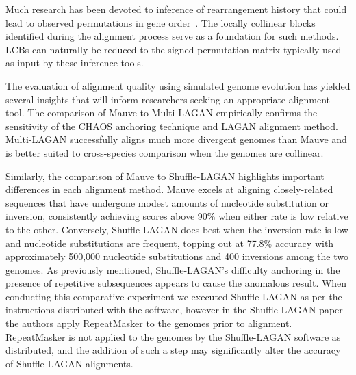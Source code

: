 \documentclass[titlepage,11pt]{article}
\begin{document}
Much research has been devoted to inference of rearrangement history that could
lead to observed permutations in gene
order~\citep{bourquepevzner,larget,badermoret,sankoff}. The locally collinear
blocks identified during the alignment process serve as a foundation for such
methods. LCBs can naturally be reduced to the signed permutation matrix
typically used as input by these inference tools.

The evaluation of alignment quality using simulated genome evolution has yielded
several insights that will inform researchers seeking an appropriate
alignment tool.  The comparison of Mauve to Multi-LAGAN empirically confirms
the sensitivity of the CHAOS anchoring technique and LAGAN alignment method.
Multi-LAGAN successfully aligns much more divergent genomes than Mauve and is
better suited to cross-species comparison when the genomes are collinear.

Similarly, the comparison of Mauve to Shuffle-LAGAN highlights important
differences in each alignment method.  Mauve excels at aligning closely-related
sequences that have undergone modest amounts of nucleotide substitution or
inversion, consistently achieving scores above 90\% when either rate is low
relative to the other.  Conversely, Shuffle-LAGAN does best when the inversion
rate is low and nucleotide substitutions are frequent, topping out at 77.8\%
accuracy with approximately 500,000 nucleotide substitutions and 400 inversions
among the two genomes.  As previously mentioned,
Shuffle-LAGAN's difficulty anchoring in the presence of repetitive subsequences appears to cause the
anomalous result. When conducting this comparative experiment we executed
Shuffle-LAGAN as per the instructions distributed with the software, however in
the Shuffle-LAGAN paper the authors apply RepeatMasker to the genomes prior to
alignment.
RepeatMasker is not applied to the genomes by the Shuffle-LAGAN software as distributed,
and the addition of such a step may significantly alter the accuracy
of Shuffle-LAGAN alignments.


\end{document}
